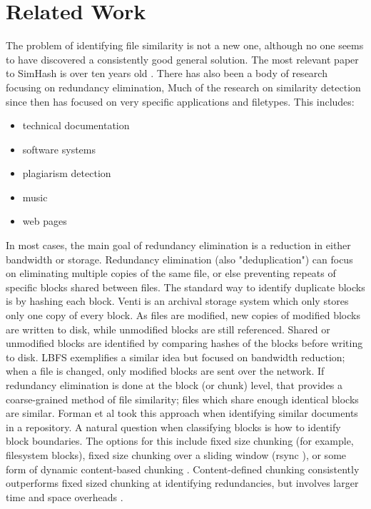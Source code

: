 \documentclass[10pt, twocolumn]{article}
\begin{document}
\section{Related Work}

The problem of identifying file similarity is not a new one, although no one seems to have discovered a consistently good general solution. The most relevant paper to SimHash is over ten years old \cite{manber}. There has also been a body of research focusing on redundancy elimination, Much of the research on similarity detection since then has focused on very specific applications and filetypes. This includes:
\begin{itemize}
\item technical documentation \cite{hpDocRepositories} 
\item software systems \cite{sourcecode} 
\item plagiarism detection \cite{hoad} \cite{bernstein}
\item music \cite{music}
\item web pages \cite{buttler}
\end{itemize}

In most cases, the main goal of redundancy elimination is a reduction in either bandwidth or storage. Redundancy elimination (also "deduplication") can focus on eliminating multiple copies of the same file, or else preventing repeats of specific blocks shared between files. The standard way to identify duplicate blocks is by hashing each block. Venti \cite{venti} is an archival storage system which only stores only one copy of every block. As files are modified, new copies of modified blocks are written to disk, while unmodified blocks are still referenced. Shared or unmodified blocks are identified by comparing hashes of the blocks before writing to disk. LBFS \cite{lbfs} exemplifies a similar idea but focused on bandwidth reduction; when a file is changed, only modified blocks are sent over the network. If redundancy elimination is done at the block (or chunk) level, that provides a coarse-grained method of file similarity; files which share enough identical blocks are similar. Forman et al\cite{hpDocRepositories} took this approach when identifying similar documents in a repository. A natural question when classifying blocks is how to identify block boundaries. The options for this include fixed size chunking (for example, filesystem blocks), fixed size chunking over a sliding window (rsync \cite{rsync}), or some form of dynamic content-based chunking \cite{lbfs}. Content-defined chunking consistently outperforms fixed sized chunking at identifying redundancies, but involves larger time and space overheads  \cite{policroniades2004adr}.
\end{document}
